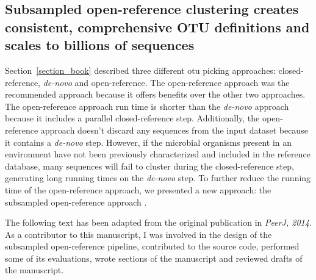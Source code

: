 \subsection{Subsampled open-reference clustering creates consistent, comprehensive OTU definitions and scales to billions of sequences}\label{subsection_openref}

Section~\ref{section_book} described three different \gls{otu} picking approaches:
closed-reference, \emph{de-novo} and open-reference. The open-reference approach
was the recommended approach because it offers benefits over the other two
approaches. The open-reference approach run time is shorter than
the \emph{de-novo} approach because it includes a parallel closed-reference step.
Additionally, the open-reference approach doesn't discard any sequences from
the input dataset because it contains a \emph{de-novo} step. However, if the microbial
organisms present in an environment have not been previously characterized and included
in the reference database, many sequences will fail to cluster
during the closed-reference step, generating long running times on the \emph{de-novo} step.
To further reduce the running time of the open-reference approach, we presented
a new approach: the subsampled open-reference approach \cite{Rideout2014}.

The following text has been adapted from the original publication in
\textsl{PeerJ, 2014}. As a contributor to this manuscript, I was involved in the
design of the subsampled open-reference pipeline, contributed
to the source code, performed some of its evaluations, wrote sections of the
manuscript and reviewed drafts of the manuscript.

